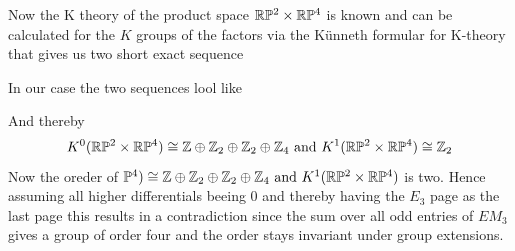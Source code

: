 \begin{example}
\begin{center}
 \end{center}
	Now the K theory of the product space $\mathbb{R}\mathbb{P}^2\times \mathbb{R}\mathbb{P}^4$ is known and can be calculated for the $K$ groups of the factors via the Künneth formular for K-theory that gives us two short exact sequence
	\begin{center}
	\end{center}In our case the two sequences lool like\begin{center}
	
	\end{center}
	And thereby \begin{equation*}
		K^0(\mathbb{R}\mathbb{P}^2\times \mathbb{R}\mathbb{P}^4)\cong \mathbb{Z}\oplus \mathbb{Z}_2\oplus \mathbb{Z}_2\oplus \mathbb{Z}_4\text{ and }	K^1(\mathbb{R}\mathbb{P}^2\times \mathbb{R}\mathbb{P}^4)\cong \mathbb{Z}_2
	\end{equation*} Now the oreder of $\mathbb{P}^4)\cong \mathbb{Z}\oplus \mathbb{Z}_2\oplus \mathbb{Z}_2\oplus \mathbb{Z}_4\text{ and }	K^1(\mathbb{R}\mathbb{P}^2\times \mathbb{R}\mathbb{P}^4)$ is two. Hence assuming all higher differentials beeing $0$ and thereby having the $E_3$ page as the last page this results in a contradiction since the sum over all odd entries of $EM_3$ gives a group of order four and the order stays invariant under group extensions. 	 
	\end{example}
	